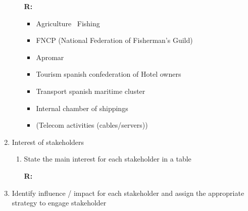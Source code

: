 \documentclass{article}
\newcommand{\tra}{\textrightarrow\ }
\begin{document}
\begin{enumerate}
\begin{enumerate}[label=\alph*)]
        \textbf{R:}
        \begin{itemize}
            \item Agriculture \tra Fishing
            \item FNCP (National Federation of Fisherman's Guild)
            \item Apromar
            \item Tourism spanish confederation of Hotel owners
            \item Transport spanish maritime cluster
            \item Internal chamber of shippings
            \item (Telecom activities (cables/servers))
        \end{itemize}


    \end{enumerate}
    
    \item Interest of stakeholders
    \begin{enumerate}[label=\alph*)]
        \item State the main interest for each stakeholder in a table

        \textbf{R:}


    \end{enumerate}

    \item Identify influence / impact for each stakeholder and assign the appropriate
    strategy to engage stakeholder
\end{enumerate}

\renewcommand{\arraystretch}{1.3} %
\end{document}
